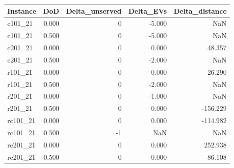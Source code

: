 \begin{tabular}{lrrrr}
\toprule
Instance & DoD & Delta\_unserved & Delta\_EVs & Delta\_distance \\
\midrule
c101\_21 & 0.000 & 0 & -5.000 & NaN \\
c101\_21 & 0.500 & 0 & -5.000 & NaN \\
c201\_21 & 0.000 & 0 & 0.000 & 48.357 \\
c201\_21 & 0.500 & 0 & -2.000 & NaN \\
r101\_21 & 0.000 & 0 & 0.000 & 26.290 \\
r101\_21 & 0.500 & 0 & -2.000 & NaN \\
r201\_21 & 0.000 & 0 & -1.000 & NaN \\
r201\_21 & 0.500 & 0 & 0.000 & -156.229 \\
rc101\_21 & 0.000 & 0 & 0.000 & -114.982 \\
rc101\_21 & 0.500 & -1 & NaN & NaN \\
rc201\_21 & 0.000 & 0 & 0.000 & 252.938 \\
rc201\_21 & 0.500 & 0 & 0.000 & -86.108 \\
\bottomrule
\end{tabular}
